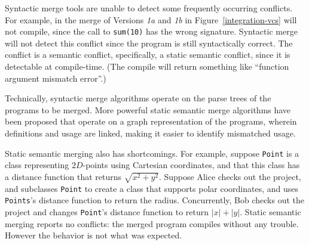 \documentclass[10pt,openany,twoside,letterpaper,extrafontsizes]{memoir}
\begin{document}
\begin{Spacing}{\commonToolsSpacing}
Syntactic merge tools are unable to detect some frequently occurring conflicts. For example, in
the merge of Versions {\em 1a} and {\em 1b} in Figure~\vref{integration-vcs}
will not compile, since  the call to \verb+sum(10)+ has the wrong signature.
Syntactic merge will not detect this conflict
since the program is still syntactically correct. The conflict is
a semantic conflict, specifically, a static semantic conflict, since
it is detectable at compile-time. (The compile will return something like
``function argument mismatch error''.)


Technically, syntactic merge algorithms operate on the parse trees of the programs
to be merged. More powerful static semantic merge algorithms have been proposed that
operate on a graph representation of the programs, wherein definitions and usage are
linked, making it easier to identify mismatched usage.

Static semantic merging also has shortcomings.  For example, suppose \texttt{Point}
is a class representing $2D$-points using Cartesian coordinates,
and that this class has a distance function that returns $\sqrt{x^2 + y^2}$.
Suppose Alice checks out the project, and subclasses \texttt{Point} to create a class that supports polar coordinates,
and uses \texttt{Points}'s distance function to return the radius.
Concurrently, Bob checks out the project and changes \texttt{Point}'s distance function to return $|x| + |y|$.
Static semantic merging reports no conflicts: the merged program compiles without any trouble.
However the behavior is not what was expected.


\end{Spacing}
\end{document}
